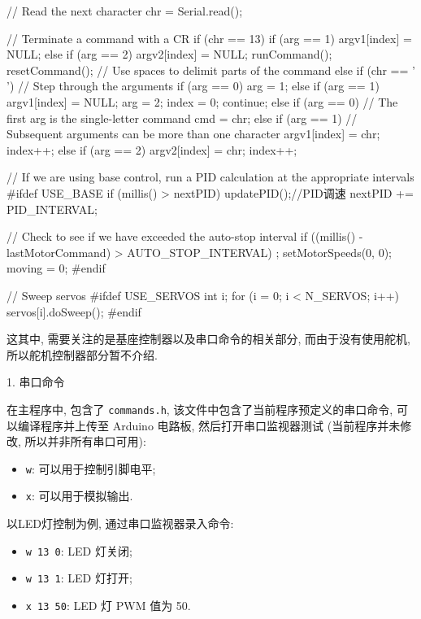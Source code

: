 \documentclass[openany, fontset=windowsold]{ctexbook}
\theoremstyle{kaiti}
\theoremstyle{normal}
\begin{document}
\begin{cpp}
{{      // Read the next character
      chr = Serial.read();

      // Terminate a command with a CR
      if (chr == 13) {
        if (arg == 1) argv1[index] = NULL;
        else if (arg == 2) argv2[index] = NULL;
        runCommand();
        resetCommand();
      }
      // Use spaces to delimit parts of the command
      else if (chr == ' ') {
        // Step through the arguments
        if (arg == 0) arg = 1;
        else if (arg == 1)  {
          argv1[index] = NULL;
          arg = 2;
          index = 0;
        }
        continue;
      }
      else {
        if (arg == 0) {
          // The first arg is the single-letter command
          cmd = chr;
        }
        else if (arg == 1) {
          // Subsequent arguments can be more than one character
          argv1[index] = chr;
          index++;
        }
        else if (arg == 2) {
          argv2[index] = chr;
          index++;
        }
      }
    }

  // If we are using base control, run a PID calculation at the appropriate intervals
  #ifdef USE_BASE
    if (millis() > nextPID) {
      updatePID();//PID调速
      nextPID += PID_INTERVAL;
    }

    // Check to see if we have exceeded the auto-stop interval
    if ((millis() - lastMotorCommand) > AUTO_STOP_INTERVAL) {;
      setMotorSpeeds(0, 0);
      moving = 0;
    }
  #endif

  // Sweep servos
  #ifdef USE_SERVOS
    int i;
    for (i = 0; i < N_SERVOS; i++) {
      servos[i].doSweep();
    }
  #endif
  }
\end{cpp}

这其中, 需要关注的是基座控制器以及串口命令的相关部分, 而由于没有使用舵机, 所以舵机控制器部分暂不介绍.

1. 串口命令

在主程序中, 包含了 \verb|commands.h|, 该文件中包含了当前程序预定义的串口命令, 可以编译程序并上传至 Arduino 电路板, 然后打开串口监视器测试 (当前程序并未修改, 所以并非所有串口可用):

\begin{itemize}
  \item \verb|w|: 可以用于控制引脚电平;
  \item \verb|x|: 可以用于模拟输出.
\end{itemize}

以LED灯控制为例, 通过串口监视器录入命令:

\begin{itemize}
  \item \verb|w 13 0|: LED 灯关闭;
  \item \verb|w 13 1|: LED 灯打开;
  \item \verb|x 13 50|: LED 灯 PWM 值为 50.
\end{itemize}
\end{document}
